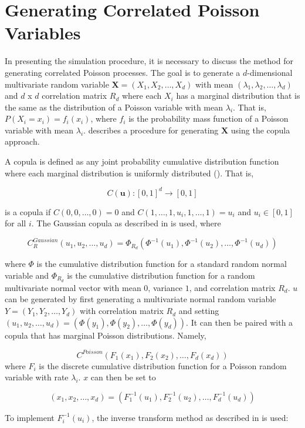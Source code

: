 \section{Generating Correlated Poisson Variables}\label{ch:generate_correlated_poisson}
In presenting the simulation procedure, it is necessary to discuss the method for generating correlated Poisson processes. The goal is to generate a $d$-dimensional multivariate random variable $\boldsymbol{X} = (X_1, X_2, \ldots, X_d)$ with mean $(\lambda_1, \lambda_2, \ldots, \lambda_{d})$ and $d$ x $d$ correlation matrix $R_d$ where each $X_i$ has a marginal distribution that is the same as the distribution of a Poisson variable with mean $\lambda_i$. That is, $P(X_i = x_i) = f_i(x_i)$, where $f_i$ is the probability mass function of a Poisson variable with mean $\lambda_i$. \cite{A8} describes a procedure for generating $\boldsymbol{X}$ using the copula approach. 

A copula is defined as any joint probability cumulative distribution function where each marginal distribution is uniformly distributed (\cite{B1}). That is, 

$$C(\boldsymbol{u}): [0,1]^d \to [0,1]$$ 

is a copula if $C(0, 0, \ldots, 0) = 0$ and $C(1, \ldots, 1, u_i, 1, \ldots, 1) = u_i$ and $u_i \in [0,1]$ for all $i$. The Gaussian copula as described in \cite{A8} is used, where

$$ C_R^{Gaussian}(u_1, u_2, \ldots, u_d) = \Phi_{R_d}(\Phi^{-1}(u_1), \Phi^{-1}(u_2), \ldots,  \Phi^{-1}(u_d))$$

where $\Phi$ is the cumulative distribution function for a standard random normal variable and $\Phi_{R_d}$ is the cumulative distribution function for a random multivariate normal vector with mean $0$, variance $1$, and correlation matrix $R_d$. $u$ can be generated by first generating a multivariate normal random variable $Y = (Y_1,Y_2, \ldots, Y_d)$ with correlation matrix $R_d$ and setting $(u_1, u_2, \ldots, u_d) = (\Phi(y_1), \Phi(y_2), \ldots,  \Phi(y_d))$. It can then be paired with a copula that has marginal Poisson distributions. Namely,

$$ C^{Poisson}(F_1(x_1), F_2(x_2), \ldots, F_d(x_d))$$ where $F_i$ is the discrete cumulative distribution function for a Poisson random variable with rate $\lambda_i$. $x$ can then be set to

$$(x_1, x_2, \ldots, x_d) = (F^{-1}_1(u_1), F^{-1}_2(u_2), \ldots, F^{-1}_d(u_d))$$

To implement $F^{-1}_i(u_i)$, the inverse transform method as described in \cite{B1} is used:
$$ $$

